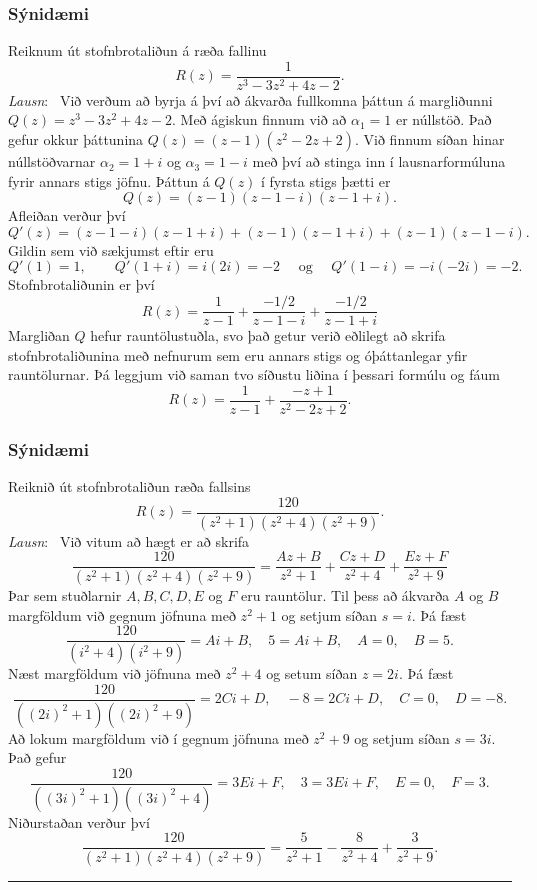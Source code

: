 \subsubsection{Sýnidæmi} Reiknum út stofnbrotaliðun á ræða fallinu
$$
R(z)=\dfrac{1}{z^3-3z^2+4z-2}.
$$
{\it Lausn}: \  Við verðum að byrja á því að ákvarða fullkomna þáttun
á margliðunni $Q(z)=z^3-3z^2+4z-2$.  Með ágiskun finnum við að
$\alpha_1=1$ er
núllstöð.  Það gefur okkur þáttunina $Q(z)=(z-1)(z^2-2z+2)$.  Við
finnum síðan hinar núllstöðvarnar $\alpha_2=1+i$ og $\alpha_3=1-i$ með
því að stinga inn í lausnarformúluna fyrir annars stigs jöfnu.  Þáttun
á $Q(z)$ í fyrsta stigs þætti er 
$$
Q(z)=(z-1)(z-1-i)(z-1+i).
$$
Afleiðan verður því 
$$
Q'(z)=(z-1-i)(z-1+i)+(z-1)(z-1+i)+(z-1)(z-1-i).
$$
Gildin sem við sækjumst eftir eru
$$
Q'(1)=1, \qquad Q'(1+i)=i(2i)=-2 \quad \text{ og } \quad
Q'(1-i)=-i(-2i)=-2.
$$
Stofnbrotaliðunin er því
$$
R(z)=\dfrac 1{z-1}+\dfrac {-1/2}{z-1-i}+\dfrac {-1/2}{z-1+i}
$$
Margliðan $Q$ hefur rauntölustuðla, svo það getur verið eðlilegt að
skrifa stofnbrotaliðunina með nefnurum sem eru annars stigs og 
óþáttanlegar yfir rauntölurnar.  Þá leggjum við saman tvo síðustu
liðina í þessari formúlu og fáum
$$
R(z)=\dfrac 1{z-1}+\dfrac {-z+1}{z^2-2z+2}.
$$




\subsubsection{Sýnidæmi}  Reiknið út stofnbrotaliðun ræða fallsins
$$
R(z)=\dfrac {120}{(z^2+1)(z^2+4)(z^2+9)}.
$$
{\it Lausn}: \ Við vitum að  hægt er að skrifa
 $$\dfrac {120}{(z^2+1)(z^2+4)(z^2+9)}=
\dfrac {Az+B}{z^2+1} +\dfrac {Cz+D}{z^2+4}+\dfrac {Ez+F}{z^2+9}
 $$
Þar sem stuðlarnir $A,B,C,D,E$ og $F$ eru rauntölur.
Til þess að ákvarða $A$ og $B$ margföldum við gegnum jöfnuna með
$z^2+1$ og setjum síðan $s=i$. Þá fæst
 $$\dfrac {120}{(i^2+4)(i^2+9)}= Ai+B, 
\quad 5=Ai+B, \quad A=0, \quad B=5.
 $$
Næst margföldum við jöfnuna með $z^2+4$ og setum síðan $z=2i$.  Þá
fæst
 $$\dfrac {120}{((2i)^2+1)((2i)^2+9)}= 2Ci+D, 
\quad -8=2Ci+D, \quad C=0, \quad D=-8.
 $$
Að lokum margföldum við í gegnum jöfnuna með $z^2+9$ og setjum síðan
$s=3i$.   Það gefur
 $$\dfrac {120}{((3i)^2+1)((3i)^2+4)}= 3Ei+F, 
\quad 3=3Ei+F, \quad E=0, \quad F=3.
 $$
Niðurstaðan verður því 
 $$\dfrac {120}{(z^2+1)(z^2+4)(z^2+9)}=
\dfrac {5}{z^2+1} -\dfrac {8}{z^2+4}+\dfrac{3}{z^2+9}.
 $$


\bigskip\hrule\bigskip

